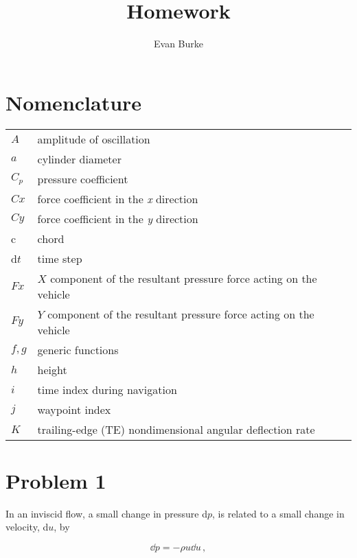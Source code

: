 \documentclass[12pt,letterpaper]{article}
\author{Evan Burke}
\title{Homework \homeworknumber}
\begin{document}
	
	
	\tableofcontents
	
	
	\newpage
	
	\section*{Nomenclature}
	
	{\renewcommand\arraystretch{1.0}
		\noindent\begin{longtable}{@{}l @{\quad=\quad} l@{}}
			$A$  & amplitude of oscillation \\
			$a$ &    cylinder diameter \\
			$C_p$& pressure coefficient \\
			$Cx$ & force coefficient in the \textit{x} direction \\
			$Cy$ & force coefficient in the \textit{y} direction \\
			c   & chord \\
			d$t$ & time step \\
			$Fx$ & $X$ component of the resultant pressure force acting on the vehicle \\
			$Fy$ & $Y$ component of the resultant pressure force acting on the vehicle \\
			$f, g$   & generic functions \\
			$h$  & height \\
			$i$  & time index during navigation \\
			$j$  & waypoint index \\
			$K$  & trailing-edge (TE) nondimensional angular deflection rate
	\end{longtable}}
	
	\newpage
	
	\section*{Problem 1}
	In an inviscid flow, a small change in pressure d$p$, is related to a small change in velocity, d$u$, by

	\begin{equation*}
		\dd p = - \rho u\dd u\,,
	\end{equation*}
	
\end{document}
